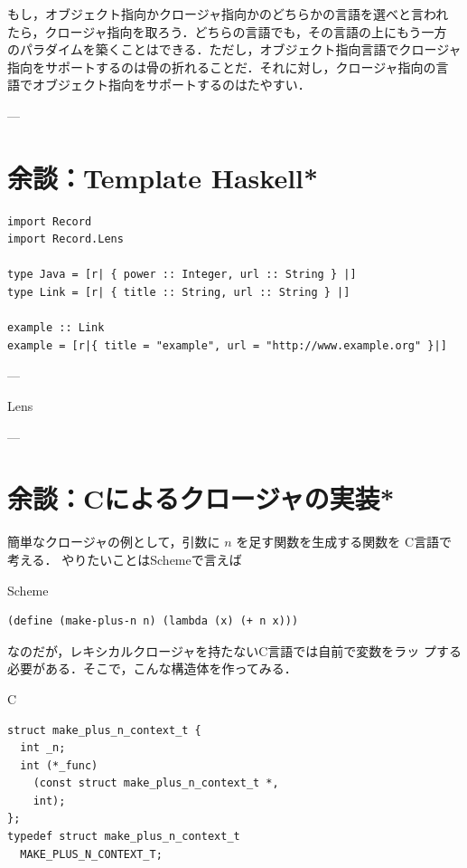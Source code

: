 \documentclass[a5paper,twoside,fleqn,draft]{jsbook}
\newcommand{\programminglanguage}[1]{\textsf{#1}}
\newcommand{\clang}{\programminglanguage{C}}
\newcommand{\haskell}{\programminglanguage{Haskell}}
\newcommand{\scheme}{\programminglanguage{Scheme}}
\newenvironment{ccode}{\begin{itembox}[r]{\clang}}{\end{itembox}}
\newenvironment{schemecode}{\begin{itembox}[r]{\scheme}}{\end{itembox}}
\begin{document}
もし，オブジェクト指向かクロージャ指向かのどちらかの言語を選べと言われ
たら，クロージャ指向を取ろう．どちらの言語でも，その言語の上にもう一方
のパラダイムを築くことはできる．ただし，オブジェクト指向言語でクロージャ
指向をサポートするのは骨の折れることだ．それに対し，クロージャ指向の言
語でオブジェクト指向をサポートするのはたやすい．

---

\section{余談：Template \haskell*}

\begin{verbatim}
import Record
import Record.Lens

type Java = [r| { power :: Integer, url :: String } |]
type Link = [r| { title :: String, url :: String } |]

example :: Link
example = [r|{ title = "example", url = "http://www.example.org" }|]
\end{verbatim}

---

Lens

---

\section*{余談：\clang によるクロージャの実装*}

簡単なクロージャの例として，引数に $n$ を足す関数を生成する関数を
\clang 言語で考える．
やりたいことは\scheme で言えば
\begin{schemecode}
\begin{verbatim}
(define (make-plus-n n) (lambda (x) (+ n x)))
\end{verbatim}
\end{schemecode}
なのだが，レキシカルクロージャを持たない\clang 言語では自前で変数をラッ
プする必要がある．そこで，こんな構造体を作ってみる．
\begin{ccode}
\begin{verbatim}
struct make_plus_n_context_t {
  int _n;
  int (*_func)
    (const struct make_plus_n_context_t *,
    int);
};
typedef struct make_plus_n_context_t
  MAKE_PLUS_N_CONTEXT_T;
\end{verbatim}
\end{ccode}
\end{document}
